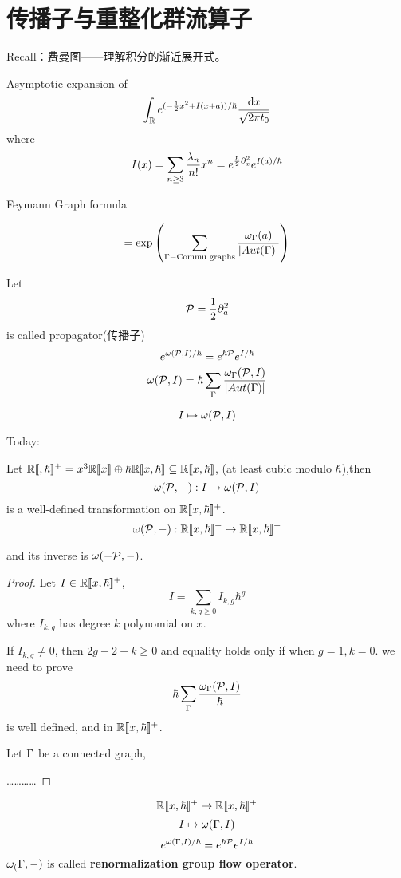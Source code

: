 \section{传播子与重整化群流算子}

Recall：费曼图——理解积分的渐近展开式。

Asymptotic expansion of
$$\int_{\mathbb{R}} e^{(-\frac{1}{2}x^2+I(x+a))/\hbar}\frac{\mathrm{d} x}{\sqrt{2\pi t_0}}$$
where
$$I(x)=\sum_{n\geq 3}\frac{\lambda_n}{n!}x^n
=e^{\frac{\hbar}{2}\partial_x^2}e^{I(a)/\hbar}$$

Feymann Graph formula

$$=\exp\left(\sum_{\Gamma-\text{Commu graphs}}
\frac{\omega_\Gamma(a)}{|Aut(\Gamma)|}\right)$$

Let
$$\mathcal{P}=\frac{1}{2}\partial_a^2$$
is called propagator(传播子)
$$e^{\omega(\mathcal{P},I)/\hbar}=e^{\hbar\mathcal{P}}e^{I/\hbar}$$
$$\omega(\mathcal{P},I)=\hbar\sum_{\Gamma}\frac{\omega_\Gamma(\mathcal{P},I)}{|Aut(\Gamma)|}$$

$$I\mapsto\omega(\mathcal{P},I)$$

Today:

\begin{prop}
Let $\bbR\fps{,\hbar}^+=x^3\bbR\fps{x}\oplus\hbar\bbR\fps{x,\hbar}\subseteq\bbR\fps{x,\hbar}$,
(at least cubic modulo $\hbar$),then
$$\omega(\mathcal{P},-):I\to\omega(\mathcal{P},I)$$
is a well-defined transformation on $\mathbb{R}[\![x,\hbar]\!]^+$.
$$\omega(\mathcal{P},-):\mathbb{R}[\![x,\hbar]\!]^+\mapsto\mathbb{R}[\![x,\hbar]\!]^+$$

and its inverse is $\omega(-\mathcal{P},-)$.
\end{prop}

\begin{proof}
Let $I\in\mathbb{R}[\![x,\hbar]\!]^+$,
$$I=\sum_{k,g\geq 0}I_{k,g}\hbar^g$$
where $I_{k,g}$ has degree $k$ polynomial on $x$.

If $I_{k,g}\neq 0$, then $2g-2+k\geq 0$
and equality holds only if when $g=1,k=0$.
we need to prove
$$\hbar\sum_{\Gamma}\frac{\omega_\Gamma(\mathcal{P},I)}{\hbar}$$
is well defined, and in $\mathbb{R}[\![x,\hbar]\!]^+$.

Let $\Gamma$ be a connected graph,

…………
\end{proof}

$$\mathbb{R}[\![x,\hbar]\!]^+\to \mathbb{R}[\![x,\hbar]\!]^+$$
$$I\mapsto\omega(\Gamma,I)$$
$$e^{\omega(\Gamma,I)/\hbar}=e^{\hbar\mathcal{P}}e^{I/\hbar}$$
$\omega_(\Gamma,-)$ is called \textbf{renormalization group flow operator}.

